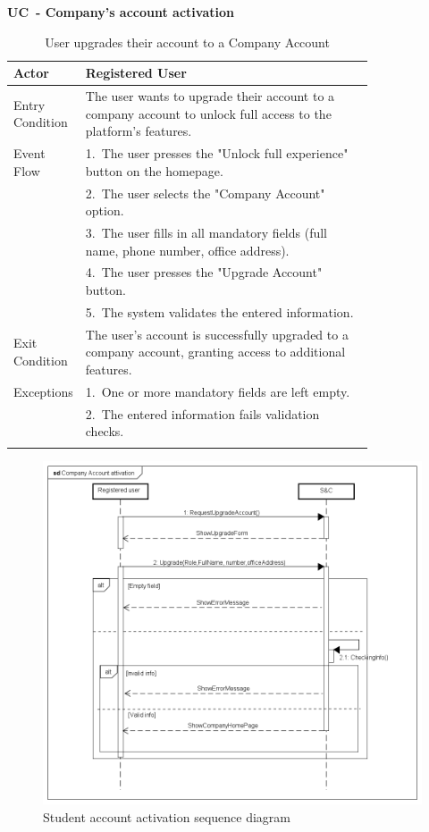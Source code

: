 \textbf{UC\cuc\  - Company's account activation}

\begin{center} 
    \renewcommand{\arraystretch}{1.2} 
    \begin{longtable}{ l p{0.8\linewidth} } 
        \hline 
        Actor & Registered User \\ \hline 
        Entry Condition & The user wants to upgrade their account to a company account to unlock full access to the platform's features. \\ \hline 
        Event Flow & 1.\ The user presses the "Unlock full experience" button on the homepage. \\ 
        & 2.\ The user selects the "Company Account" option. \\ 
        & 3.\ The user fills in all mandatory fields (full name, phone number, office address). \\ 
        & 4.\ The user presses the "Upgrade Account" button. \\ 
        & 5.\ The system validates the entered information. \\ \hline 
        Exit Condition & The user's account is successfully upgraded to a company account, granting access to additional features. \\ \hline 
        Exceptions & 1.\ One or more mandatory fields are left empty. \\ 
        & 2.\ The entered information fails validation checks. \\ \hline 
        \caption{User upgrades their account to a Company Account} 
        \label{tab:company_activation_uc} 
    \end{longtable} 
\end{center}

\begin{figure}[H]
    \centering
    \includegraphics[width=1\linewidth]{Images/Sequence diagrams/Company Account attivation.png}
    \caption{Student account activation sequence diagram}
    \label{fig:enter-label}
\end{figure}

